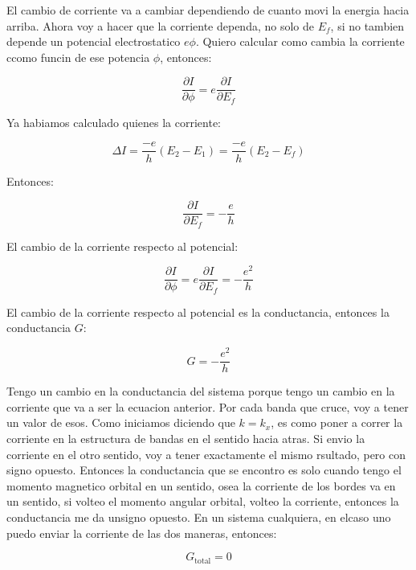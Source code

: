 \documentclass[11pt,fleqn]{book}
\begin{document}
El cambio de corriente va a cambiar dependiendo de cuanto movi la energia hacia arriba. Ahora voy a hacer que la corriente dependa, no solo de $E_{f}$, si no tambien depende un potencial electrostatico $e\phi$. Quiero calcular como cambia la corriente ccomo funcin de ese potencia $\phi$, entonces:

\begin{equation}
    \frac{\partial I}{\partial\phi}=e\frac{\partial I}{\partial E_{f}}
\end{equation}  

Ya habiamos calculado quienes la corriente:

\begin{equation}
    \Delta I=\frac{-e}{h}(E_{2}-E_{1})=\frac{-e}{h}(E_{2}-E_{f})
\end{equation}

Entonces:

\begin{equation}
    \frac{\partial I}{\partial E_{f}}=-\frac{e}{h}
\end{equation}

El cambio de la corriente respecto al potencial:

\begin{equation}
    \frac{\partial I}{\partial \phi}=e\frac{\partial I}{\partial E_{f}}=-\frac{e^{2}}{h}
\end{equation}

El cambio de la corriente respecto al potencial es la conductancia, entonces la conductancia $G$:

\begin{equation}
    G=-\frac{e^{2}}{h}
\end{equation}

Tengo un cambio en la conductancia del sistema porque tengo un cambio en la corriente que va a ser la ecuacion anterior. Por cada banda que cruce, voy a tener un valor de esos. Como iniciamos diciendo que $k=k_{x}$, es como poner a correr la corriente en la estructura de bandas en el sentido hacia atras. Si envio la corriente en el otro sentido, voy a tener exactamente el mismo rsultado, pero con signo opuesto. Entonces la conductancia que se encontro es solo cuando tengo el momento magnetico orbital en un sentido, osea la corriente de los bordes va en un sentido, si volteo el momento angular orbital, volteo la corriente, entonces la conductancia me da unsigno opuesto. En un sistema cualquiera, en elcaso uno puedo enviar la corriente de las dos maneras, entonces:

\begin{equation}
    G_{\text{total}}=0
\end{equation}
\end{document}

